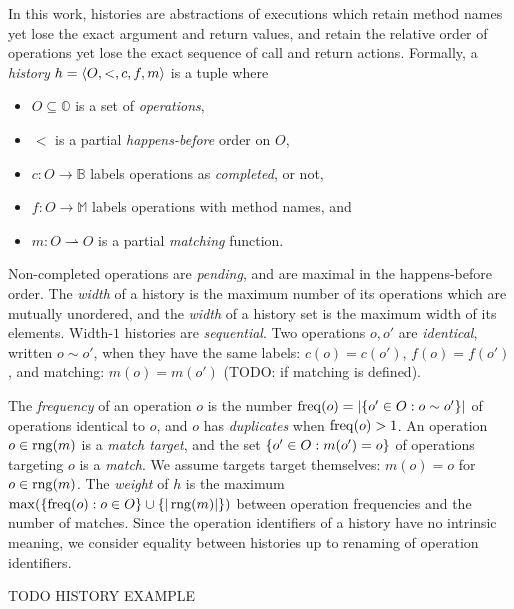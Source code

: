 In this work, histories are abstractions of executions which retain method
names yet lose the exact argument and return values, and retain the relative
order of operations yet lose the exact sequence of call and return actions.
Formally, a \emph{history} $h = {\left\langle{O,<,c,f,m}\right\rangle}$ is a tuple where
\begin{itemize}

  \item $O \subseteq \mathbb{O}$ is a set of \emph{operations},

  \item $<$ is a partial \emph{happens-before} order on $O$,

  \item $c: O \to \mathbb{B}$ labels operations as \emph{completed}, or not,

  \item $f: O \to \mathbb{M}$ labels operations with method names, and

  \item $m: O \rightharpoonup O$ is a partial \emph{matching} function.

\end{itemize}
Non-completed operations are \emph{pending}, and are maximal in the
happens-before order. The \emph{width} of a history is the maximum number of
its operations which are mutually unordered, and the \emph{width} of a history
set is the maximum width of its elements. Width-$1$ histories are
\emph{sequential}.
Two operations $o, o'$ are \emph{identical}, written $o \sim o'$, when they
have the same labels: $c(o) = c(o')$, $f(o) = f(o')$, and matching: $m(o) =
m(o')$ (TODO: if matching is defined). 

The \emph{frequency} of an operation $o$ is the number $\operatorname{freq}(o) =
|{\{{ o' \in O : o \sim o' }\}}|$ of operations identical to $o$, and $o$ has
\emph{duplicates} when $\operatorname{freq}(o) > 1$. An operation $o \in \operatorname{rng}(m)$ is a
\emph{match target}, and the set ${\{{ o' \in O : m(o') = o}\}}$ of operations
targeting $o$ is a \emph{match}. We assume targets target themselves: $m(o) =
o$ for $o \in \operatorname{rng}(m)$. The \emph{weight} of $h$ is the maximum $\max({\{{
\operatorname{freq}(o) : o \in O }\}} \cup {\{{|\operatorname{rng}(m)|}\}})$ between operation frequencies and
the number of matches. Since the operation identifiers of a history have no
intrinsic meaning, we consider equality between histories up to renaming of
operation identifiers.

\begin{example}

  TODO HISTORY EXAMPLE

\end{example}

